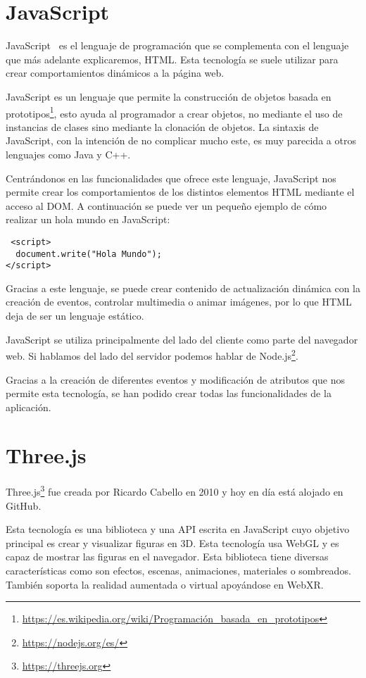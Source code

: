 \documentclass[a4paper, 12pt]{book}
\begin{document}
\section{JavaScript} %
\label{sec:JavaScript}

JavaScript~\cite{eloquent} es el lenguaje de programación que se complementa con el lenguaje que más adelante explicaremos, HTML. Esta tecnología se suele utilizar para crear comportamientos dinámicos a la página web.

JavaScript es un lenguaje que permite la construcción de objetos basada en prototipos\footnote{\url{https://es.wikipedia.org/wiki/Programación_basada_en_prototipos}}, esto ayuda al programador a crear objetos, no mediante el uso de  instancias de clases sino mediante la clonación de objetos. La sintaxis de JavaScript, con la intención de no complicar mucho este, es muy parecida a otros lenguajes como Java y C++.

Centrándonos en las funcionalidades que ofrece este lenguaje, JavaScript nos permite crear los comportamientos de los distintos elementos  HTML mediante el acceso al DOM. A continuación se puede ver un pequeño ejemplo de cómo realizar un hola mundo en JavaScript:

\begin{verbatim}
 <script>
  document.write("Hola Mundo");
</script>   
\end{verbatim}

Gracias a este lenguaje, se puede crear contenido de actualización dinámica con la creación de eventos, controlar multimedia o animar imágenes, por lo que HTML deja de ser un lenguaje estático.

JavaScript se utiliza principalmente del lado del cliente como parte del navegador web. Si hablamos del lado del servidor podemos hablar de Node.js\footnote{\url{https://nodejs.org/es/}}.

Gracias a la creación de diferentes eventos y  modificación de atributos  que nos permite esta tecnología, se han podido crear todas las funcionalidades de la aplicación.

\section{Three.js} %
\label{sec:Three}
Three.js\footnote{\url{https://threejs.org}} fue creada por Ricardo Cabello en 2010 y hoy en día está alojado en GitHub.

Esta tecnología es una biblioteca y una API escrita en JavaScript cuyo objetivo principal es crear y visualizar figuras en 3D. Esta tecnología usa WebGL y es capaz de mostrar las figuras en el navegador. Esta biblioteca tiene diversas características como son efectos, escenas, animaciones, materiales o sombreados. También soporta la realidad aumentada o virtual apoyándose en WebXR.
\end{document}
